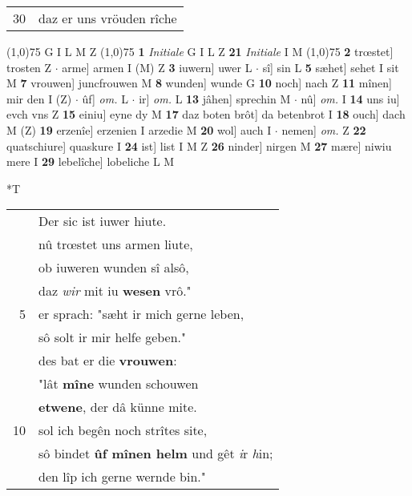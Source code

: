 \documentclass[8pt,a4paper,notitlepage]{article}
\begin{document}
\begin{table}[ht]
\begin{minipage}[t]{0.5\linewidth}
\begin{tabular}{rl}
30 & daz er uns vröuden rîche\\ 
\end{tabular}
\scriptsize
\line(1,0){75} \newline
G I L M Z \newline
\line(1,0){75} \newline
\textbf{1} \textit{Initiale} G I L Z  \textbf{21} \textit{Initiale} I M  \newline
\line(1,0){75} \newline
\textbf{2} trœstet] trosten Z  $\cdot$ arme] armen I (M) Z \textbf{3} iuwern] uwer L  $\cdot$ sî] sin L \textbf{5} sæhet] sehet I sit M \textbf{7} vrouwen] juncfrouwen M \textbf{8} wunden] wunde G \textbf{10} noch] nach Z \textbf{11} mînen] mir den I (Z)  $\cdot$ ûf] \textit{om.} L  $\cdot$ ir] \textit{om.} L \textbf{13} jâhen] sprechin M  $\cdot$ nû] \textit{om.} I \textbf{14} uns iu] evch vns Z \textbf{15} einiu] eyne dy M \textbf{17} daz boten brôt] da betenbrot I \textbf{18} ouch] dach M (Z) \textbf{19} erzenîe] erzenien I arzedie M \textbf{20} wol] auch I  $\cdot$ nemen] \textit{om.} Z \textbf{22} quatschiure] quaskure I \textbf{24} ist] list I M Z \textbf{26} ninder] nirgen M \textbf{27} mære] niwiu mere I \textbf{29} lebelîche] lobeliche L M \newline
\end{minipage}
\hspace{0.5cm}
\begin{minipage}[t]{0.5\linewidth}
\small
\begin{center}*T
\end{center}
\begin{tabular}{rl}
 & Der sic ist iuwer hiute.\\ 
 & nû trœstet uns armen liute,\\ 
 & ob iuweren wunden sî alsô,\\ 
 & daz \textit{wir} mit iu \textbf{wesen} vrô."\\ 
5 & er sprach: "sæht ir mich gerne leben,\\ 
 & sô solt ir mir helfe geben."\\ 
 & des bat er die \textbf{vrouwen}:\\ 
 & "lât \textbf{mîne} wunden schouwen\\ 
 & \textbf{etwene}, der dâ künne mite.\\ 
10 & sol ich begên noch strîtes site,\\ 
 & sô bindet \textbf{ûf mînen helm} und gêt \textit{i}r \textit{h}in;\\ 
 & den lîp ich gerne wernde bin."\\ 

\end{tabular}
\end{minipage}
\end{table}
\end{document}
